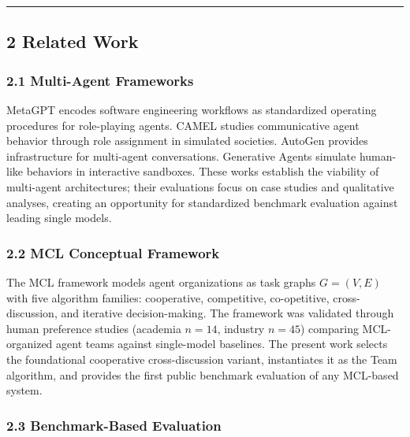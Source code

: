 \documentclass[
]{article}
\begin{document}
\begin{center}\rule{0.5\linewidth}{0.5pt}\end{center}

\subsection{2 Related Work}\label{related-work}

\subsubsection{2.1 Multi-Agent Frameworks}\label{multi-agent-frameworks}

MetaGPT \cite{Hong2023MetaGPT} encodes software engineering workflows as standardized operating procedures for role-playing agents. CAMEL \cite{Li2023CAMEL} studies communicative agent behavior through role assignment in simulated societies. AutoGen \cite{Wu2023AutoGen} provides infrastructure for multi-agent conversations. Generative Agents \cite{Park2023GenerativeAgents} simulate human-like behaviors in interactive sandboxes. These works establish the viability of multi-agent architectures; their evaluations focus on case studies and qualitative analyses, creating an opportunity for standardized benchmark evaluation against leading single models.

\subsubsection{2.2 MCL Conceptual Framework}\label{mcl-framework}

The MCL framework \cite{Zhang2025MCL} models agent organizations as task graphs \(G=(V,E)\) with five algorithm families: cooperative, competitive, co-opetitive, cross-discussion, and iterative decision-making. The framework was validated through human preference studies (academia \(n=14\), industry \(n=45\)) comparing MCL-organized agent teams against single-model baselines. The present work selects the foundational cooperative cross-discussion variant, instantiates it as the Team algorithm, and provides the first public benchmark evaluation of any MCL-based system.

\subsubsection{2.3 Benchmark-Based Evaluation}\label{benchmark-evaluation}
\end{document}
